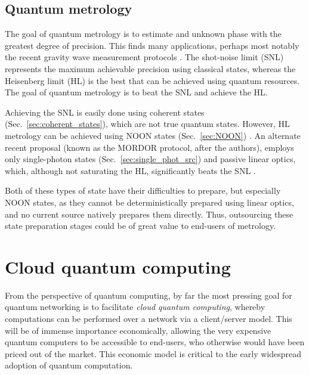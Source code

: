 \documentclass[aps,rmp,twocolumn,amsmath,amssymb,nofootinbib,superscriptaddress]{revtex4}
\begin{document}
%
%

\subsection{Quantum metrology} \label{sec:metrology}

The goal of quantum metrology is to estimate and unknown phase with the greatest degree of precision. This finds many applications, perhaps most notably the recent gravity wave measurement protocols \cite{???}. The shot-noise limit (SNL) represents the maximum achievable precision using classical states, whereas the Heisenberg limit (HL) is the best that can be achieved using quantum resources. The goal of quantum metrology is to beat the SNL and achieve the HL.

Achieving the SNL is easily done using coherent states (Sec.~\ref{sec:coherent_states}), which are not true quantum states. However, HL metrology can be achieved using NOON states (Sec.~\ref{sec:NOON}) \cite{bib:Dowling08}. An alternate recent proposal (known as the MORDOR protocol, after the authors), employs only single-photon states (Sec.~\ref{sec:single_phot_src}) and passive linear optics, which, although not saturating the HL, significantly beats the SNL \cite{MORDOR, MORDOR2}.

Both of these types of state have their difficulties to prepare, but especially NOON states, as they cannot be deterministically prepared using linear optics, and no current source natively prepares them directly. Thus, outsourcing these state preparation stages could be of great value to end-users of metrology.

\cite{DomBerry}

%
%

\section{Cloud quantum computing} \label{sec:cloud}

From the perspective of quantum computing, by far the most pressing goal for quantum networking is to facilitate \emph{cloud quantum computing}, whereby computations can be performed over a network via a client/server model. This will be of immense importance economically, allowing the very expensive quantum computers to be accessible to end-users, who otherwise would have been priced out of the market. This economic model is critical to the early widespread adoption of quantum computation.
\end{document}
